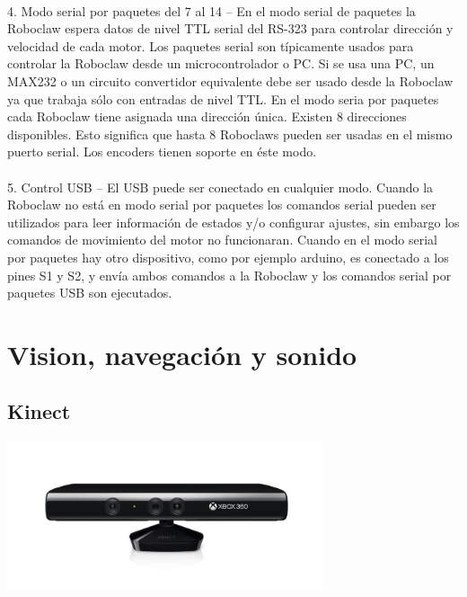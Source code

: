 \documentclass[a4paper]{book}
\begin{document}
\\
4. Modo serial por paquetes del 7 al 14 – En el modo serial de paquetes la Roboclaw espera datos de nivel TTL serial del 
RS-323 para controlar dirección y velocidad de cada motor. Los paquetes serial son típicamente usados para controlar la 
Roboclaw desde un microcontrolador o PC. Si se usa una PC, un MAX232 o un circuito convertidor equivalente debe ser usado 
desde la Roboclaw ya que trabaja sólo con entradas de nivel TTL. En el modo seria por paquetes cada Roboclaw tiene asignada
una dirección única. Existen 8 direcciones disponibles. Esto significa que hasta 8 Roboclaws pueden ser usadas en el mismo 
puerto serial. Los encoders tienen soporte en éste modo.\\
\\
5. Control USB – El USB puede ser conectado en cualquier modo. Cuando la Roboclaw no está en modo serial por paquetes los
comandos serial pueden ser utilizados para leer información de estados y/o configurar ajustes, sin embargo los comandos de 
movimiento del motor no funcionaran. Cuando en el modo serial por paquetes hay otro dispositivo, como por ejemplo arduino, 
es conectado a los pines S1 y S2, y envía ambos comandos a la Roboclaw y los comandos serial por paquetes USB son ejecutados.\\

\vfill

\section{Vision, navegación y sonido}
\subsection{Kinect}

\begin{center}
\includegraphics[width=0.7\textwidth]{Figures/Hardware/Partes/Kinect.png}
\label{fig:Hardware:Partes:Kinect}
\end{center}
\end{document}
